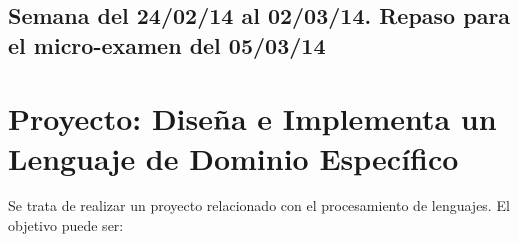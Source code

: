 \subsection{Semana del 24/02/14 al 02/03/14. Repaso para el micro-examen del 05/03/14}

\begin{enumerate}

\end{enumerate}


\section{Proyecto: Diseña e Implementa un Lenguaje de Dominio Específico}

Se trata de realizar un proyecto relacionado con el procesamiento de lenguajes.
El objetivo puede ser:


